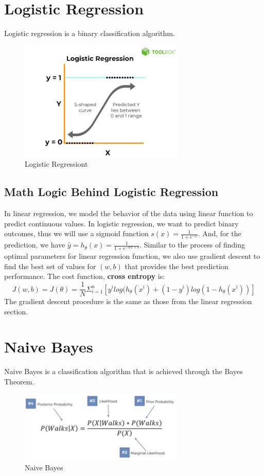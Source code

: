 \documentclass[12pt]{article}
\begin{document}
\section{Logistic Regression}
Logistic regression is a binary classification algorithm.
\begin{figure}[htbp]
\begin{center}
\includegraphics[width = 0.7\textwidth]{Images/Logistic Regression.png}
\caption{Logistic Regressiont}
\label{default}
\end{center}
\end{figure}

\subsection{Math Logic Behind Logistic Regression}
In linear regression, we model the behavior of the data using linear function to predict continuous values. In logistic regression, we want to predict binary outcomes, thus we will use a sigmoid function $s(x) = \frac{1}{1 + e^{-x}}$. And, for the prediction, we have $\hat{y} = h_{\theta}(x) = \frac{1}{1 + e^{-wx+b}}$. Similar to the process of finding optimal parameters for linear regression function, we also use gradient descent to find the best set of values for $(w, b)$ that provides the best prediction performance. The cost function, \textbf{cross entropy} is:
$$J(w, b) = J(\theta) = \frac{1}{N}\Sigma_{i=1}^n[y^ilog(h_{\theta}(x^i) + (1-y^i)log(1 - h_{\theta}(x^i))]$$
The gradient descent procedure is the same as those from the linear regression section.
\newpage

\section{Naive Bayes}
Naive Bayes is a classification algorithm that is achieved through the Bayes Theorem.
\begin{figure}[htbp]
\begin{center}
\includegraphics[width = 0.7\textwidth]{Images/Naive Bayes.jpeg}
\caption{Naive Bayes}
\label{default}
\end{center}
\end{figure}
\end{document}
